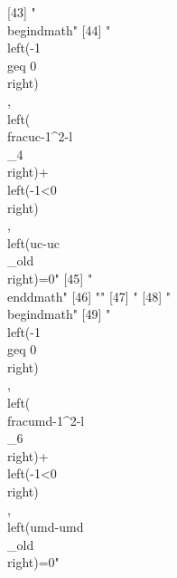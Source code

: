 [43] "\\begin{dmath}"                                                                                                                                                                                                                                                                                
[44] "\\left(-1\\geq 0\\right)\\, \\left(\\frac{{uc}}{-1^{2}}-{{l\\_4}}\\right)+\\left(-1<0\\right)\\, \\left({uc}-{{uc\\_old}}\\right)=0"                                                                                                                                                           
[45] "\\end{dmath}"                                                                                                                                                                                                                                                                                  
[46] ""                                                                                                                                                                                                                                                                                              
[47] "%
[48] "\\begin{dmath}"                                                                                                                                                                                                                                                                                
[49] "\\left(-1\\geq 0\\right)\\, \\left(\\frac{{umd}}{-1^{2}}-{{l\\_6}}\\right)+\\left(-1<0\\right)\\, \\left({umd}-{{umd\\_old}}\\right)=0"                                                                                                                                                        
